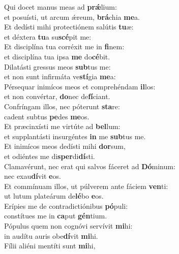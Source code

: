 \oddverse Qui docet manus meas ad \textbf{prǽ}lium:~\*\\
\oddverse et posuísti, ut arcum ǽreum, \textbf{brá}chia \textbf{me}a.\\
\evenverse Et dedísti mihi protectiónem salútis \textbf{tu}æ:~\*\\
\evenverse et déxtera \textbf{tu}a su\textbf{scé}pit me:\\
\oddverse Et disciplína tua corréxit me in \textbf{fi}nem:~\*\\
\oddverse et disciplína tua ipsa \textbf{me} do\textbf{cé}bit.\\
\evenverse Dilatásti gressus meos \textbf{sub}tus me:~\*\\
\evenverse et non sunt infirmáta ve\textbf{stí}gia \textbf{me}a:\\
\oddverse Pérsequar inimícos meos et comprehéndam \textbf{il}los:~\*\\
\oddverse et non convértar, \textbf{do}nec de\textbf{fí}ciant.\\
\evenverse Confríngam illos, nec póterunt \textbf{sta}re:~\*\\
\evenverse cadent subtus \textbf{pe}des \textbf{me}os.\\
\oddverse Et præcinxísti me virtúte ad \textbf{bel}lum:~\*\\
\oddverse et supplantásti insurgéntes \textbf{in} me \textbf{sub}tus me.\\
\evenverse Et inimícos meos dedísti mihi \textbf{dor}sum,~\*\\
\evenverse et odiéntes me di\textbf{sper}di\textbf{dí}sti.\\
\oddverse Clamavérunt, nec erat qui salvos fáceret ad \textbf{Dó}minum:~\*\\
\oddverse nec exau\textbf{dí}vit \textbf{e}os.\\
\evenverse Et commínuam illos, ut púlverem ante fáciem \textbf{ven}ti:~\*\\
\evenverse ut lutum plateárum de\textbf{lé}bo \textbf{e}os.\\
\oddverse Erípies me de contradictiónibus \textbf{pó}puli:~\*\\
\oddverse constítues me in \textbf{ca}put \textbf{gén}tium.\\
\evenverse Pópulus quem non cognóvi servívit \textbf{mi}hi:~\*\\
\evenverse in audítu auris obe\textbf{dí}vit \textbf{mi}hi.\\
\oddverse Fílii aliéni mentíti sunt \textbf{mi}hi,~\*\\
